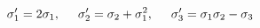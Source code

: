 \begin{displaymath}
\sigma_1' = 2\sigma_1,\hspace{.5cm} \sigma_2' = \sigma_2 +\sigma_1^2, \hspace{.5cm}\sigma_3' = \sigma_1\sigma_2 - \sigma_3  
\end{displaymath}
